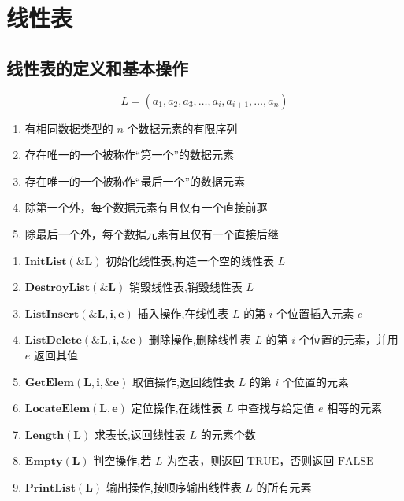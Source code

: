 \chapter{线性表}

\section{线性表的定义和基本操作}
\begin{definition}[线性表]
    $$L=(a_{1},a_{2},a_{3},\dots,a_{i},a_{i+1},\dots,a_{n})$$
    \begin{enumerate}
        \item 有相同数据类型的 $n$ 个数据元素的有限序列
        \item 存在唯一的一个被称作“第一个”的数据元素
        \item 存在唯一的一个被称作“最后一个”的数据元素
        \item 除第一个外，每个数据元素有且仅有一个直接前驱
        \item 除最后一个外，每个数据元素有且仅有一个直接后继
    \end{enumerate}
\end{definition}

\begin{definition}[线性表基本操作]
    \begin{enumerate}
        \item $\mathbf{InitList(\& L)}$  初始化线性表,构造一个空的线性表 $L$
        \item $\mathbf{DestroyList(\& L)}$  销毁线性表,销毁线性表 $L$
        \item $\mathbf{ListInsert(\&L,i,e)}$ 插入操作,在线性表 $L$ 的第 $i$ 个位置插入元素 $e$
        \item $\mathbf{ListDelete(\&L,i,\&e)}$ 删除操作,删除线性表 $L$ 的第 $i$ 个位置的元素，并用 $e$ 返回其值
        \item $\mathbf{GetElem(L,i,\&e)}$ 取值操作,返回线性表 $L$ 的第 $i$ 个位置的元素
        \item $\mathbf{LocateElem(L,e)}$ 定位操作,在线性表 $L$ 中查找与给定值 $e$ 相等的元素
        \item $\mathbf{Length(L)}$ 求表长,返回线性表 $L$ 的元素个数
        \item $\mathbf{Empty(L)}$ 判空操作,若 $L$ 为空表，则返回 $\text{TRUE}$，否则返回 $\text{FALSE}$
        \item $\mathbf{PrintList(L)}$ 输出操作,按顺序输出线性表 $L$ 的所有元素 
    \end{enumerate}
\end{definition}

